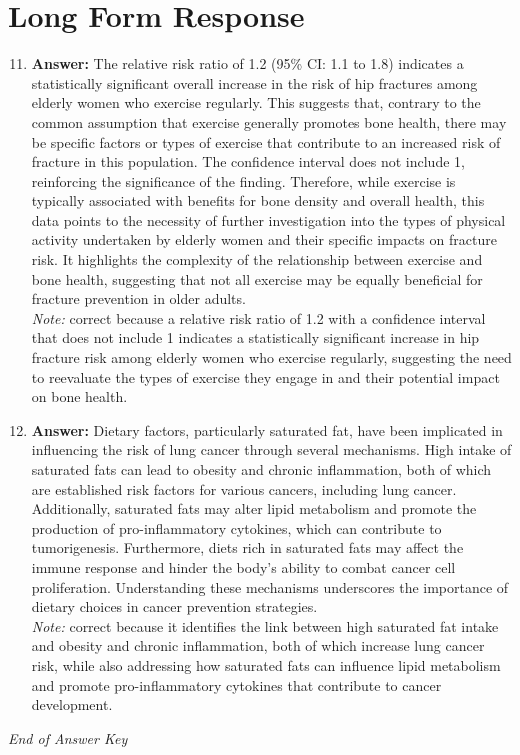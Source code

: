 \documentclass[12pt]{article}
\begin{document}
\section*{Long Form Response}
\begin{enumerate}[label=\arabic*.]
\setcounter{enumi}{10}
\item \textbf{Answer:} The relative risk ratio of 1.2 (95\% CI: 1.1 to 1.8) indicates a statistically significant overall increase in the risk of hip fractures among elderly women who exercise regularly. This suggests that, contrary to the common assumption that exercise generally promotes bone health, there may be specific factors or types of exercise that contribute to an increased risk of fracture in this population. The confidence interval does not include 1, reinforcing the significance of the finding. Therefore, while exercise is typically associated with benefits for bone density and overall health, this data points to the necessity of further investigation into the types of physical activity undertaken by elderly women and their specific impacts on fracture risk. It highlights the complexity of the relationship between exercise and bone health, suggesting that not all exercise may be equally beneficial for fracture prevention in older adults.
\\ \textit{Note:} correct because a relative risk ratio of 1.2 with a confidence interval that does not include 1 indicates a statistically significant increase in hip fracture risk among elderly women who exercise regularly, suggesting the need to reevaluate the types of exercise they engage in and their potential impact on bone health.
\item \textbf{Answer:} Dietary factors, particularly saturated fat, have been implicated in influencing the risk of lung cancer through several mechanisms. High intake of saturated fats can lead to obesity and chronic inflammation, both of which are established risk factors for various cancers, including lung cancer. Additionally, saturated fats may alter lipid metabolism and promote the production of pro-inflammatory cytokines, which can contribute to tumorigenesis. Furthermore, diets rich in saturated fats may affect the immune response and hinder the body's ability to combat cancer cell proliferation. Understanding these mechanisms underscores the importance of dietary choices in cancer prevention strategies.
\\ \textit{Note:} correct because it identifies the link between high saturated fat intake and obesity and chronic inflammation, both of which increase lung cancer risk, while also addressing how saturated fats can influence lipid metabolism and promote pro-inflammatory cytokines that contribute to cancer development.
\end{enumerate}

\vfill
\noindent\textit{End of Answer Key}
\end{document}
